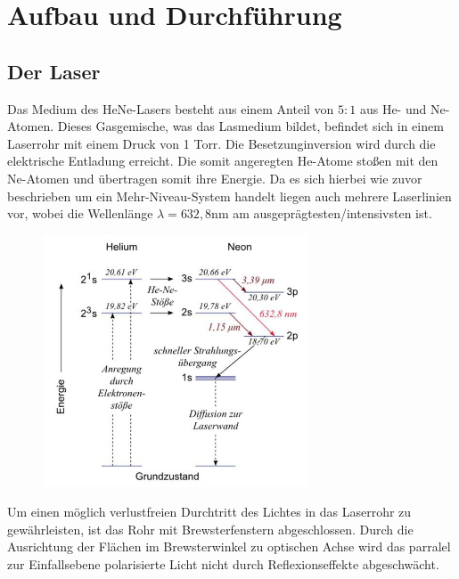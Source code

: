 \newpage
\section{Aufbau und Durchführung}
\subsection{Der Laser}
Das Medium des HeNe-Lasers besteht aus einem Anteil von $5:1$ aus He- und Ne-Atomen.
Dieses Gasgemische, was das Lasmedium bildet, befindet sich in einem Laserrohr mit einem Druck von 1 Torr. Die Besetzunginversion wird durch die
elektrische Entladung erreicht. Die somit angeregten He-Atome stoßen mit den Ne-Atomen und übertragen somit ihre Energie.
Da es sich hierbei wie zuvor beschrieben um ein Mehr-Niveau-System handelt liegen auch mehrere Laserlinien vor, wobei die Wellenlänge
$\lambda=632,8$nm am ausgeprägtesten/intensivsten ist.\\
\begin{figure}[H]
    \center
    \includegraphics[width=0.7\textwidth]{bilder/lasermedium.jpg}
    \caption{}
\end{figure}

Um einen möglich verlustfreien Durchtritt des Lichtes in das Laserrohr zu gewährleisten, ist das Rohr mit Brewsterfenstern abgeschlossen.
Durch die Ausrichtung der Flächen im Brewsterwinkel zu optischen Achse wird das parralel zur Einfallsebene polarisierte Licht nicht durch Reflexionseffekte abgeschwächt.

